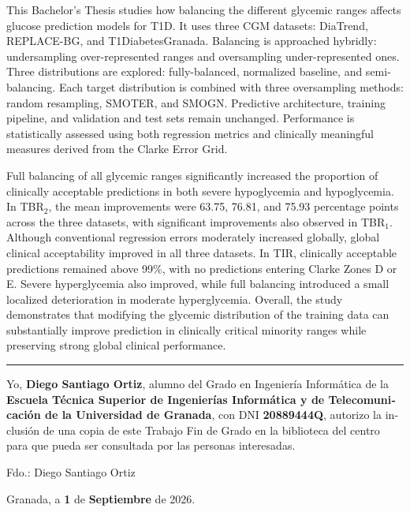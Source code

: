 This Bachelor’s Thesis studies how balancing the different glycemic ranges affects glucose prediction models for T1D. It uses three CGM datasets: DiaTrend, REPLACE-BG, and T1DiabetesGranada. Balancing is approached hybridly: undersampling over-represented ranges and oversampling under-represented ones. Three distributions are explored: fully-balanced, normalized baseline, and semi-balancing. Each target distribution is combined with three oversampling methods: random resampling, SMOTER, and SMOGN. Predictive architecture, training pipeline, and validation and test sets remain unchanged. Performance is statistically assessed using both regression metrics and clinically meaningful measures derived from the Clarke Error Grid.

Full balancing of all glycemic ranges significantly increased the proportion of clinically acceptable predictions in both severe hypoglycemia and hypoglycemia. In TBR$_2$, the mean improvements were 63.75, 76.81, and 75.93 percentage points across the three datasets, with significant improvements also observed in TBR$_1$. Although conventional regression errors moderately increased globally, global clinical acceptability improved in all three datasets. In TIR, clinically acceptable predictions remained above 99\%, with no predictions entering Clarke Zones D or E. Severe hyperglycemia also improved, while full balancing introduced a small localized deterioration in moderate hyperglycemia. Overall, the study demonstrates that modifying the glycemic distribution of the training data can substantially improve prediction in clinically critical minority ranges while preserving strong global clinical performance.

\cleardoublepage
\thispagestyle{empty}

\begin{otherlanguage}{spanish}

\noindent
\rule{\textwidth}{2pt}

\vspace{1cm}

Yo, \textbf{Diego Santiago Ortiz}, alumno del Grado en Ingeniería Informática
de la \textbf{Escuela Técnica Superior de Ingenierías Informática y de
Telecomunicación de la Universidad de Granada}, con DNI
\textbf{20889444Q}, autorizo la inclusión de una copia de este Trabajo Fin de
Grado en la biblioteca del centro para que pueda ser consultada por las
personas interesadas.

\vspace{6cm}

\noindent
Fdo.: Diego Santiago Ortiz

\vspace{2cm}

\begin{flushright}
Granada, a \textbf{1} de \textbf{Septiembre} de 2026.
\end{flushright}

\end{otherlanguage}


